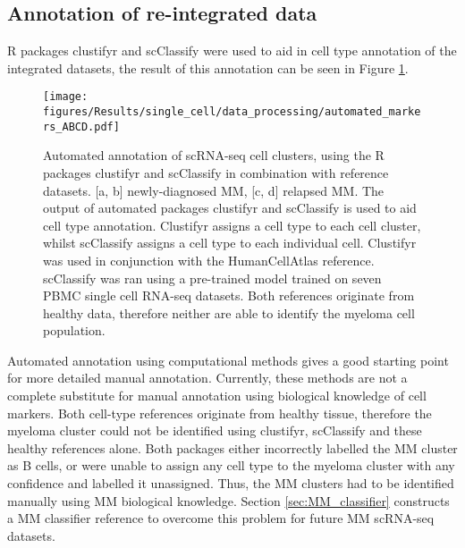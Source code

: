 \subsection{Annotation of re-integrated data}\label{subsec:sc_annotate}
R packages clustifyr and scClassify were used to aid in cell type annotation of the integrated datasets, the result of this annotation can be seen in Figure \ref{fig:annotation_automated}.
\begin{figure}[htb]
    \centering
    \texttt{[image: figures/Results/single\_cell/data\_processing/automated\_markers\_ABCD.pdf]}
    \caption[Automated annotation of scRNA-seq data]{Automated annotation of scRNA-seq cell clusters, using the R packages clustifyr and scClassify in combination with reference datasets.
    [a, b] newly-diagnosed MM, [c, d] relapsed MM.
    The output of automated packages clustifyr and scClassify is used to aid cell type annotation.
    Clustifyr assigns a cell type to each cell cluster, whilst scClassify assigns a cell type to each individual cell.
    Clustifyr was used in conjunction with the HumanCellAtlas reference.
    scClassify was ran using a pre-trained model trained on seven PBMC single cell RNA-seq datasets.
    Both references originate from healthy data, therefore neither are able to identify the myeloma cell population.}
    \label{fig:annotation_automated}
\end{figure}

Automated annotation using computational methods gives a good starting point for more detailed manual annotation.
Currently, these methods are not a complete substitute for manual annotation using biological knowledge of cell markers.
Both cell-type references originate from healthy tissue, therefore the myeloma cluster could not be identified using clustifyr, scClassify and these healthy references alone.
Both packages either incorrectly labelled the MM cluster as B cells, or were unable to assign any cell type to the myeloma cluster with any confidence and labelled it unassigned.
Thus, the MM clusters had to be identified manually using MM biological knowledge.
Section \ref{sec:MM_classifier} constructs a MM classifier reference to overcome this problem for future MM scRNA-seq datasets.

